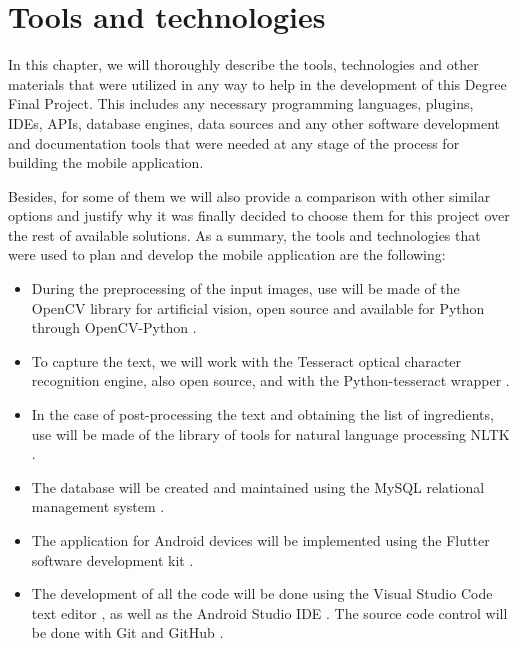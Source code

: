 \chapter{Tools and technologies}
\label{chapter5}

In this chapter, we will thoroughly describe the tools, technologies and other materials that were utilized in any way to help in the development of this Degree Final Project. This includes any necessary programming languages, plugins, IDEs, APIs, database engines, data sources and any other software development and documentation tools that were needed at any stage of the process for building the mobile application.

Besides, for some of them we will also provide a comparison with other similar options and justify why it was finally decided to choose them for this project over the rest of available solutions. As a summary, the tools and technologies that were used to plan and develop the mobile application are the following:

\begin{itemize}
\item During the preprocessing of the input images, use will be made of the OpenCV \cite{noauthor_opencv_2021} library for artificial vision, open source and available for Python \cite{noauthor_python_2021} through OpenCV-Python \cite{noauthor_opencv-python_2021}.
\item To capture the text, we will work with the Tesseract \cite{noauthor_tesseract_2021} optical character recognition engine, also open source, and with the Python-tesseract wrapper \cite{lee_pytesseract_2021}.
\item In the case of post-processing the text and obtaining the list of ingredients, use will be made of the library of tools for natural language processing NLTK \cite{noauthor_natural_2021}.
\item The database will be created and maintained using the MySQL relational management system \cite{noauthor_mysql_2021}.
\item The application for Android devices will be implemented using the Flutter software development kit \cite{noauthor_flutter_2021}.
\item The development of all the code will be done using the Visual Studio Code text editor \cite{noauthor_documentation_2021}, as well as the Android Studio IDE \cite{noauthor_introduccion_2021}. The source code control will be done with Git \cite{noauthor_git_2021} and GitHub \cite{noauthor_githubcom_2021}.
\end{itemize}

